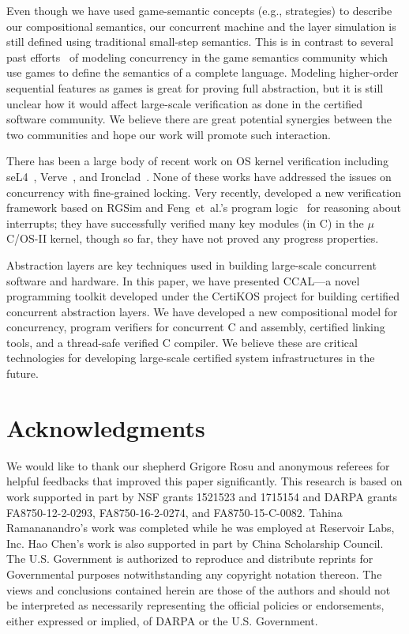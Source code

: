  Even though we have used
game-semantic concepts (e.g., strategies) to describe our
compositional semantics, our concurrent machine and the layer simulation is still defined using
traditional small-step semantics.  This is in contrast to several past
efforts~\cite{ghica08,nishimura13,rideau11,abramsky99} of modeling
concurrency in the game semantics community which use games to
define the semantics of a complete language. Modeling higher-order
sequential features as games is great for proving full abstraction,
but it is still unclear how it would affect large-scale 
verification as done in the certified software community.  We 
believe there are great potential synergies between the two communities
and hope our work will promote such interaction.

 There has been a large body
of recent work on OS kernel verification including
seL4~\cite{klein2009sel4,klein14},
Verve~\cite{hawblitzel10},
and Ironclad~\cite{ironclad14}. None of these works have addressed the
issues on concurrency with fine-grained locking. Very recently,
\citet{xu16} developed a new verification framework based on RGSim
and Feng~{et~al.}'s program logic~\cite{feng08:aim} for reasoning
about interrupts; they have successfully verified many key modules
(in C) in the $\mu$C/OS-II kernel, though so far, they have not proved
any progress properties.


Abstraction layers are key techniques used in building large-scale
concurrent software and hardware. In this paper, we have presented
CCAL---a novel programming toolkit developed under the CertiKOS project for building certified concurrent
abstraction layers.  We have developed a new compositional model
for concurrency, program verifiers for concurrent C and assembly,
certified linking tools, and a thread-safe verified C compiler. 
We believe these are critical technologies 
for developing large-scale certified system infrastructures in the future.

\section*{Acknowledgments}
We would like to thank our shepherd Grigore Rosu and anonymous
referees for helpful feedbacks that improved this paper significantly.
This research is based on work supported in part by NSF grants 1521523
and 1715154 and DARPA grants FA8750-12-2-0293, FA8750-16-2-0274, and
FA8750-15-C-0082. Tahina Ramananandro's work was completed while he
was employed at Reservoir Labs, Inc. Hao Chen's work is also supported
in part by China Scholarship Council.  The U.S. Government is
authorized to reproduce and distribute reprints for Governmental
purposes notwithstanding any copyright notation thereon. The views and
conclusions contained herein are those of the authors and should not
be interpreted as necessarily representing the official policies or
endorsements, either expressed or implied, of DARPA or the
U.S. Government.

